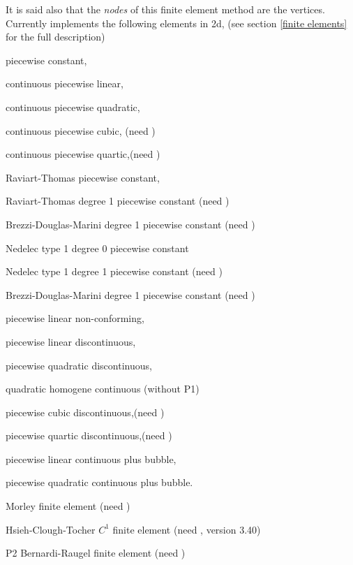 \documentclass[a4paper,twoside,12pt]{book}
\begin{document}
It is said also that the \emph{nodes} of this finite element method
are the vertices.
\\
Currently \freefempp implements the following elements  in 2d, (see section \ref{finite elements} for the full description)
{\parskip=0cm
\par {} piecewise constant,
\par {} continuous piecewise linear,
\par {} continuous piecewise quadratic,
\par {} continuous piecewise cubic, (need  )
\par {} continuous piecewise quartic,(need  )
\par {} Raviart-Thomas piecewise constant,
\par {} Raviart-Thomas degree 1  piecewise constant (need  )
\par {} Brezzi-Douglas-Marini degree 1  piecewise constant (need  )
\par {} Nedelec type 1 degree 0  piecewise constant 
\par {} Nedelec type 1 degree 1  piecewise constant (need  )
\par {} Brezzi-Douglas-Marini degree 1  piecewise constant (need  )
\par {} piecewise linear non-conforming,
\par {} piecewise linear discontinuous,
\par {} piecewise quadratic discontinuous,
\par {}  quadratic homogene continuous (without P1)
\par {} piecewise cubic discontinuous,(need  )
\par {} piecewise quartic discontinuous,(need  )
\par {} piecewise linear continuous plus bubble,
\par {} piecewise quadratic continuous plus bubble.
\par {} Morley finite element (need   )
\par {} Hsieh-Clough-Tocher $C^1$ finite element (need   , version 3.40)
\par {} P2 Bernardi-Raugel finite element  (need   )

}
\end{document}
